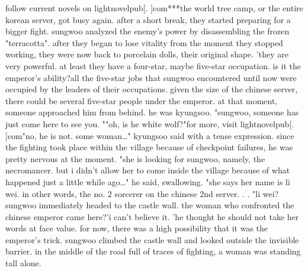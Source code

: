 follow current novels on lightnovelpub[.
]com***the world tree camp, or the entire korean server, got busy again.
 after a short break, they started preparing for a bigger fight.
sungwoo analyzed the enemy's power by disassembling the frozen "terracotta".
after they began to lose vitality from the moment they stopped working, they were now back to porcelain dolls, their original shape.
'they are very powerful.
 at least they have a four-star, maybe five-star occupation.
 is it the emperor's ability?all the five-star jobs that sungwoo encountered until now were occupied by the leaders of their occupations.
 given the size of the chinese server, there could be several five-star people under the emperor.
at that moment, someone approached him from behind.
 he was kyungsoo.
"sungwoo, someone has just come here to see you.
""oh, is he white wolf?"for more, visit lightnovelpub[.
]com"no, he is not.
 some woman…" kyungsoo said with a tense expression.
 since the fighting took place within the village because of checkpoint failures, he was pretty nervous at the moment.
 "she is looking for sungwoo, namely, the necromancer.
 but i didn't allow her to come inside the village because of what happened just a little while ago…" he said, swallowing.
 "she says her name is li wei.
 in other words, the no.
 2 sorcerer on the chinese 2nd server.
.
.
"li wei? sungwoo immediately headed to the castle wall.
 the woman who confronted the chinese emperor came here?'i can't believe it.
'he thought he should not take her words at face value.
 for now, there was a high possibility that it was the emperor's trick.
sungwoo climbed the castle wall and looked outside the invisible barrier.
 in the middle of the road full of traces of fighting, a woman was standing tall alone.
 
